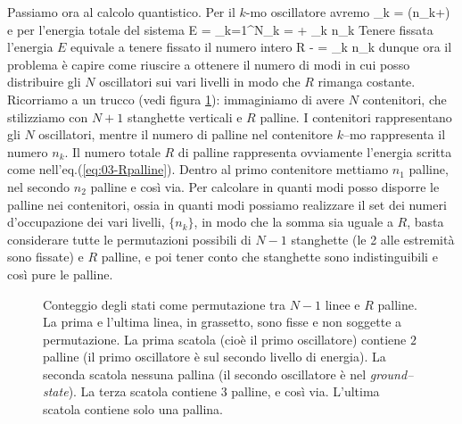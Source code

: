 Passiamo ora al calcolo quantistico. Per il $k$-mo oscillatore avremo
\be
\epsilon_k = \left(n_k+\right)\hbar\omega
\ee
e per l'energia totale del sistema
\be
E = \sum_{k=1}^N\epsilon_k =  + \hbar\omega\sum_k n_k
\ee
Tenere fissata l'energia $E$ equivale a tenere fissato il numero intero
\be
\label{eq:03-Rpalline}
R \equiv {} -  = \sum_k n_k
\ee
dunque ora il problema è capire come riuscire a ottenere il numero di modi in cui posso distribuire gli $N$ oscillatori sui vari livelli in modo che $R$ rimanga costante. Ricorriamo a un trucco (vedi figura \ref{fig:03-scapal}): immaginiamo di avere $N$ contenitori, che stilizziamo con $N+1$ stanghette verticali e $R$ palline. I contenitori rappresentano gli $N$ oscillatori, mentre il numero di palline nel contenitore $k$--mo rappresenta il numero $n_k$. Il numero totale $R$ di palline rappresenta ovviamente l'energia scritta come nell'eq.(\ref{eq:03-Rpalline}). Dentro al primo contenitore mettiamo $n_1$ palline, nel secondo $n_2$ palline e così via. Per calcolare in quanti modi posso disporre le palline nei contenitori, ossia in quanti modi possiamo realizzare il set dei numeri d'occupazione dei vari livelli, $\{n_k\}$, in modo che la somma sia uguale a $R$, basta considerare tutte le permutazioni possibili di $N-1$ stanghette (le 2 alle estremità sono fissate) e $R$ palline, e poi tener conto che stanghette sono indistinguibili e così pure le palline.
\begin{figure}[!ht]
  \centering
  
  \caption{Conteggio degli stati come permutazione tra $N-1$ linee e $R$ palline. La prima e l'ultima linea, in grassetto, sono fisse e non soggette a permutazione. La prima scatola (cioè il primo oscillatore) contiene $2$ palline (il primo oscillatore è sul secondo livello di energia). La seconda scatola nessuna pallina (il secondo oscillatore è nel {\em ground--state}). La terza scatola contiene $3$ palline, e così via. L'ultima scatola contiene solo una pallina.}
  \label{fig:03-scapal}
\end{figure}

